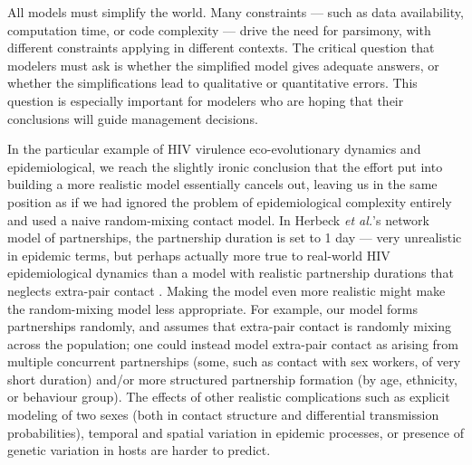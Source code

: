 \documentclass[10pt,letterpaper]{article}
\newcommand{\etal}{\textit{et al.}}
\begin{document}
All models must simplify the world.  Many constraints --- such as data
availability, computation time, or code complexity --- drive the need
for parsimony, with different constraints applying in different
contexts. The critical question that modelers must ask is whether the
simplified model gives adequate answers, or whether the
simplifications lead to qualitative or quantitative errors.
This question is especially important for modelers who
are hoping that their conclusions will guide management decisions.

In the particular example of HIV virulence eco-evolutionary dynamics
and epidemiological, we reach the slightly ironic conclusion that the
effort put into building a more realistic model essentially cancels
out, leaving us in the same position as if we had ignored the problem
of epidemiological complexity entirely and used a naive random-mixing
contact model. In Herbeck \etal's \cite{herbeck_hiv_2014} network model of partnerships, the partnership duration is set to 1 day --- very unrealistic in epidemic terms, but perhaps
actually more true to real-world HIV epidemiological dynamics than a
model with realistic partnership durations that neglects extra-pair
contact \cite{herbeck2016evolution}. Making the model even more realistic
might make the random-mixing model less appropriate. For
example, our model forms partnerships randomly, and assumes that
extra-pair contact is randomly mixing across the population;
one could instead model extra-pair contact as arising from
multiple concurrent partnerships (some, such as contact with sex
workers, of very short duration) and/or more structured partnership
formation (by age, ethnicity, or behaviour group). The effects of
other realistic complications such as explicit modeling of two
sexes (both in contact structure and differential transmission
probabilities), temporal and spatial variation in epidemic processes,
or presence of genetic variation in hosts are harder to predict.
\end{document}
